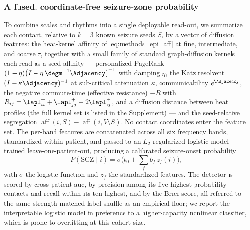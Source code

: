\subsubsection{A fused, coordinate-free seizure-zone probability}
\label{sssec:methods_epi_detector}
To combine scales and rhythms into a single deployable read-out, we summarize each contact, relative to \(k=\num{3}\) known seizure seeds \(S\), by a vector of diffusion features: the heat-kernel affinity of \eqref{eq:methods_epi_aff} at fine, intermediate, and coarse \(\tau\), together with a small family of standard graph-diffusion kernels each read as a seed affinity --- personalized PageRank \((1-\eta)\big(I-\eta\,\degm^{-1}\Adjacency\big)^{-1}\) with damping \(\eta\), the Katz resolvent \((I-\kappa\Adjacency)^{-1}\) at sub-critical attenuation \(\kappa\), communicability \(e^{\Adjacency}\), the negative commute-time (effective resistance) \(-R\) with \(R_{ij}=\lapl^{+}_{ii}+\lapl^{+}_{jj}-2\lapl^{+}_{ij}\), and a diffusion distance between heat profiles (the full kernel set is listed in the Supplement) --- and the seed-relative segregation \(\operatorname{aff}(i,S)-\operatorname{aff}(i,V\setminus S)\). No contact coordinates enter the feature set. The per-band features are concatenated across all six frequency bands, standardized within patient, and passed to an \(L_{2}\)-regularized logistic model trained leave-one-patient-out, producing a calibrated seizure-onset probability
\begin{equation}
    P(\mathrm{SOZ}\mid i) = \sigma\!\Big(b_{0} + \textstyle\sum_{f} b_{f}\,z_{f}(i)\Big),
    \label{eq:methods_epi_detector}
\end{equation}
with \(\sigma\) the logistic function and \(z_{f}\) the standardized features. The detector is scored by cross-patient \gls{auc}, by precision among its five highest-probability contacts and recall within its ten highest, and by the Brier score, all referred to the same strength-matched label shuffle as an empirical floor; we report the interpretable logistic model in preference to a higher-capacity nonlinear classifier, which is prone to overfitting at this cohort size.

